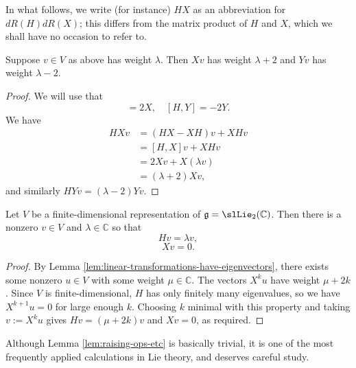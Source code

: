 \documentclass[reqno]{amsart} 
\begin{document}
\begin{remark}
  In what follows,
  we write (for instance) $H X$
  as an abbreviation for
  $d R(H) d R(X)$;
  this differs from the matrix product of
  $H$ and $X$, which we shall have no occasion to refer to.
\end{remark}

\begin{lemma}\label{lem:raising-ops-etc}
  Suppose $v \in V$ as above
  has weight $\lambda$.
  Then $X v$ has weight $\lambda + 2$
  and $Y v$ has weight $\lambda - 2$.
\end{lemma}
\begin{proof}
  We will use that
  \begin{equation*}
    [H,X] = 2 X,
    \quad [H,Y] = - 2 Y.
    \end{equation*}
  We have
  \begin{align*}
    H X v &= (H X - X H) v + X H v \\
          &= [H,X] v + X H v
            \\
          &= 2 X v + X (\lambda  v)
            \\
          &= (\lambda + 2)X v,
  \end{align*}
  and similarly
  $H Y v = (\lambda - 2) Y v$.
\end{proof}

\begin{lemma}
  Let $V$ be a finite-dimensional representation
  of $\mathfrak{g} = \slLie_2(\mathbb{C})$.
  Then there is a nonzero $v \in V$
  and $\lambda \in \mathbb{C}$
  so that
  \begin{equation*}
    H v = \lambda v,
  \end{equation*}
  \begin{equation*}
    X v = 0.
  \end{equation*}
\end{lemma}
\begin{proof}
  By Lemma \ref{lem:linear-transformations-have-eigenvectors},
  there exists some nonzero $u \in V$
  with some weight $\mu \in \mathbb{C}$.
  The vectors $X^k u$ have weight $\mu + 2k$.
  Since $V$ is finite-dimensional,
  $H$ has only finitely many eigenvalues,
  so we have $X^{k+1} u = 0$ for large enough $k$.
  Choosing $k$ minimal with this property
  and taking $v := X^k u$
  gives
  $H v = (\mu + 2 k) v$
  and $X v = 0$, as required.
\end{proof}
\begin{remark}
  Although Lemma \ref{lem:raising-ops-etc} is basically trivial,
  it is one of the most frequently
  applied calculations in Lie theory, and deserves careful study.
\end{remark}
\end{document}
